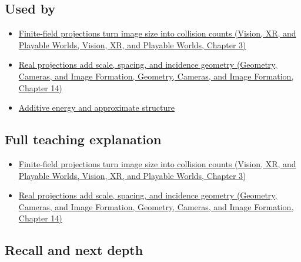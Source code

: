 \subsection{Used by}\label{appendix-3c73f7862157-used-by}

\begin{itemize}
\tightlist
\item
  \href{../07-Vision-XR-and-Playable-Worlds/main.pdf\#nameddest=04-visual-computing-ii-ch032-finite-field-projections-turn-image-size-into-collision-counts}{Finite-field projections turn image size into collision counts (Vision, XR, and Playable Worlds, Vision, XR, and Playable Worlds, Chapter 3)}
\item
  \href{../03-Geometry-Cameras-and-Image-Formation/main.pdf\#nameddest=04-visual-computing-ii-ch033-real-projections-add-scale-spacing-and-incidence-geometry}{Real projections add scale, spacing, and incidence geometry (Geometry, Cameras, and Image Formation, Geometry, Cameras, and Image Formation, Chapter 14)}
\item
  \hyperref[appendix-b0732b22e7d6]{Additive energy and approximate structure}
\end{itemize}

\subsection{Full teaching explanation}\label{appendix-3c73f7862157-full-teaching-explanation}

\begin{itemize}
\tightlist
\item
  \href{../07-Vision-XR-and-Playable-Worlds/main.pdf\#nameddest=04-visual-computing-ii-ch032-finite-field-projections-turn-image-size-into-collision-counts}{Finite-field projections turn image size into collision counts (Vision, XR, and Playable Worlds, Vision, XR, and Playable Worlds, Chapter 3)}
\item
  \href{../03-Geometry-Cameras-and-Image-Formation/main.pdf\#nameddest=04-visual-computing-ii-ch033-real-projections-add-scale-spacing-and-incidence-geometry}{Real projections add scale, spacing, and incidence geometry (Geometry, Cameras, and Image Formation, Geometry, Cameras, and Image Formation, Chapter 14)}
\end{itemize}

\subsection{Recall and next depth}\label{appendix-3c73f7862157-recall-and-next-depth}

